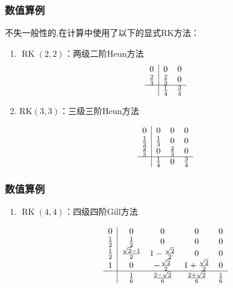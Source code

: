 \documentclass[aspectratio=169]{beamer}
\numberwithin{theorem}{section} %
\begin{document}
\begin{frame}\frametitle{数值算例}
	不失一般性的,在计算中使用了以下的显式RK方法\cite{shuEfficientImplementationEssentially1988}：
	\begin{enumerate}
	\item $\operatorname{RK}(2,2)$：两级二阶Heun方法%
	\begin{equation}
	\begin{array}{c|cc}
	0 & 0 & 0 \\
	\frac{2}{3} & \frac{2}{3} & 0 \\
	\hline & \frac{1}{4} & \frac{3}{4}
	\end{array}
	\end{equation}
		
	\item $\mathrm{RK}(3,3)$：三级三阶Heun方法%
		
	\begin{equation}
	\begin{array}{c|ccc}
	0 & 0 & 0 & 0 \\
	\frac{1}{3} & \frac{1}{3} & 0 & 0 \\
	\frac{2}{3} & 0 & \frac{2}{3} & 0 \\
	\hline & \frac{1}{4} & 0 & \frac{3}{4}
	\end{array}
	\end{equation}
	\end{enumerate}
\end{frame}
\begin{frame}\frametitle{数值算例}
	
	\begin{enumerate}[3]
		\item $\operatorname{RK}(4,4)$：四级四阶Gill方法%
			
	\begin{equation}
	\begin{array}{c|cccc}
	0 & 0 & 0 & 0 & 0 \\
	\frac{1}{2} & \frac{1}{2} & 0 & 0 & 0 \\
	\frac{1}{2} & \frac{\sqrt{2}-1}{2} & 1-\frac{\sqrt{2}}{2} & 0 & 0 \\
	1 & 0 & -\frac{\sqrt{2}}{2} & 1+\frac{\sqrt{2}}{2} & 0 \\
	\hline & \frac{1}{6} & \frac{2-\sqrt{2}}{6} & \frac{2+\sqrt{2}}{6} & \frac{1}{6}
	\end{array}
	\end{equation}
	\end{enumerate}
\end{frame}
\end{document}
